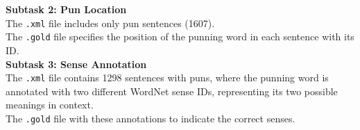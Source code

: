 \documentclass[10pt]{article}
\begin{document}
\textbf{{Subtask 2: Pun Location}} \\[6pt]
The \texttt{.xml} file includes only pun sentences (1607).\\[6pt]
The \texttt{.gold} file specifies the position of the punning word in each sentence with its ID.\\[6pt]

\textbf{{Subtask 3: Sense Annotation}} \\[6pt]
The \texttt{.xml} file contains 1298 sentences with puns, where the punning word is annotated with two different WordNet sense IDs, representing its two possible meanings in context.\\[6pt]
The \texttt{.gold} file with these annotations to indicate the correct senses.
\end{document}
